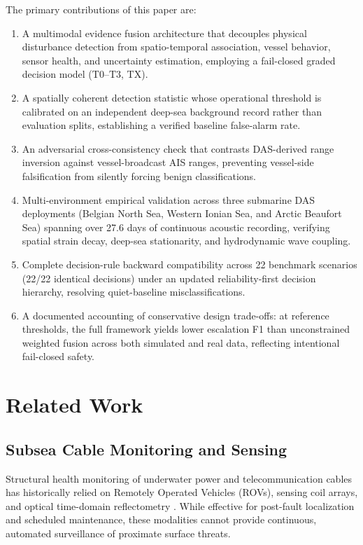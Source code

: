 \documentclass[conference]{IEEEtran}
\newcommand{\dstate}[1]{\ensuremath{\mathrm{#1}}}
\begin{document}
The primary contributions of this paper are:
\begin{enumerate}
\item A multimodal evidence fusion architecture that decouples physical disturbance detection from spatio-temporal association, vessel behavior, sensor health, and uncertainty estimation, employing a fail-closed graded decision model (\dstate{T0}--\dstate{T3}, \dstate{TX}).
\item A spatially coherent detection statistic whose operational threshold is calibrated on an independent deep-sea background record rather than evaluation splits, establishing a verified baseline false-alarm rate.
\item An adversarial cross-consistency check that contrasts DAS-derived range inversion against vessel-broadcast AIS ranges, preventing vessel-side falsification from silently forcing benign classifications.
\item Multi-environment empirical validation across three submarine DAS deployments (Belgian North Sea, Western Ionian Sea, and Arctic Beaufort Sea) spanning over 27.6 days of continuous acoustic recording, verifying spatial strain decay, deep-sea stationarity, and hydrodynamic wave coupling.
\item Complete decision-rule backward compatibility across 22 benchmark scenarios (22/22 identical decisions) under an updated reliability-first decision hierarchy, resolving quiet-baseline misclassifications.
\item A documented accounting of conservative design trade-offs: at reference thresholds, the full framework yields lower escalation F1 than unconstrained weighted fusion across both simulated and real data, reflecting intentional fail-closed safety.
\end{enumerate}

\section{Related Work}

\subsection{Subsea Cable Monitoring and Sensing}
Structural health monitoring of underwater power and telecommunication cables has historically relied on Remotely Operated Vehicles (ROVs), sensing coil arrays, and optical time-domain reflectometry \cite{b1,b2,b3,b4}. While effective for post-fault localization and scheduled maintenance, these modalities cannot provide continuous, automated surveillance of proximate surface threats.
\end{document}
